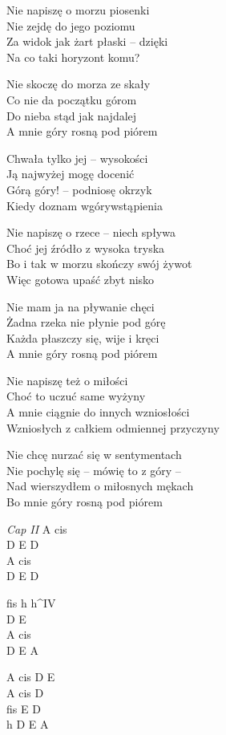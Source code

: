 \begin{text}
    \hfill\break
    Nie napiszę o morzu piosenki\\
    Nie zejdę do jego poziomu\\
    Za widok jak żart płaski -- dzięki\\
    Na co taki horyzont komu?

    Nie skoczę do morza ze skały\\
    Co nie da początku górom\\
    Do nieba stąd jak najdalej\\
    A mnie góry rosną pod piórem

    \vin Chwała tylko jej -- wysokości\\
    \vin Ją najwyżej mogę docenić\\
    \vin Górą góry! -- podniosę okrzyk\\
    \vin Kiedy doznam wgórywstąpienia

    Nie napiszę o rzece -- niech spływa\\
    Choć jej źródło z wysoka tryska\\
    Bo i tak w morzu skończy swój żywot\\
    Więc gotowa upaść zbyt nisko

    Nie mam ja na pływanie chęci\\
    Żadna rzeka nie płynie pod górę\\
    Każda płaszczy się, wije i kręci\\
    A mnie góry rosną pod piórem

    Nie napiszę też o miłości\\
    Choć to uczuć same wyżyny\\
    A mnie ciągnie do innych wzniosłości\\
    Wzniosłych z całkiem odmiennej przyczyny

    Nie chcę nurzać się w sentymentach\\
    Nie pochylę się -- mówię to z góry --\\
    Nad wierszydłem o miłosnych mękach\\
    Bo mnie góry rosną pod piórem
\end{text}
\begin{chord}
    \textit{Cap II}
    A cis\\
    D E D\\
    A cis\\
    D E D

    fis h h^{IV}\\
    D E\\
    A cis\\
    D E A

    A cis D E\\
    A cis D\\
    fis E D\\
    h D E A
\end{chord}